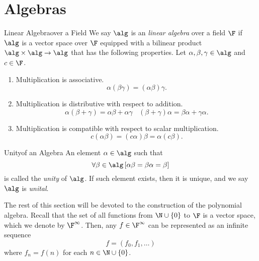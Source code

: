 \documentclass[linearalgebraII]{subfiles}
\begin{document}

    \section{Algebras} 
    
    \begin{definition}{Linear Algebra}{over a Field}
        We say $\alg$ is an \emph{linear algebra} over a field $\F$ if $\alg$ is a vector space over $\F$ equipped with a bilinear product $\alg\times\alg\to\alg$ that has the following properties. Let $\alpha, \beta, \gamma\in \alg$ and $c\in \F$. 

        \begin{enumerate}
            \item Multiplication is associative.
                \begin{equation*}
                    \alpha(\beta\gamma) = (\alpha\beta)\gamma.
                \end{equation*}
            \item Multiplication is distributive with respect to addition.
                \begin{equation*}
                    \alpha(\beta+\gamma) = \alpha\beta + \alpha\gamma \ \ \ \ (\beta+\gamma)\alpha = \beta\alpha + \gamma\alpha.
                \end{equation*}
            \item Multiplication is compatible with respect to scalar multiplication.
                \begin{equation*}
                    c(\alpha\beta) = (c\alpha)\beta = \alpha(c\beta).
                \end{equation*}
        \end{enumerate}
    \end{definition}

    \begin{definition}{Unity}{of an Algebra}
        An element $\alpha\in\alg$ such that
        \begin{equation*}
            \forall\beta\in\alg \left[ \alpha\beta = \beta\alpha = \beta \right]  
        \end{equation*}
        is called the \emph{unity} of $\alg$. If such element exists, then it is unique, and we say $\alg$ is \emph{unital}.
    \end{definition}

    \begin{remark}
        The rest of this section will be devoted to the construction of the polynomial algebra. Recall that the set of all functions from $\N\cup \left\lbrace 0 \right\rbrace$ to $\F$ is a vector space, which we denote by $\F^\infty$. Then, any $f\in\F^\infty$ can be represented as an infinite sequence
        \begin{equation*}
            f = \left( f_0, f_1, \ldots \right) 
        \end{equation*}
        where $f_n = f(n)$ for each $n\in\N\cup \left\lbrace 0 \right\rbrace$.
    \end{remark}
\end{document}
